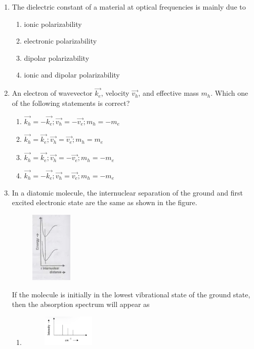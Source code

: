 \documentclass[journal]{IEEEtran}
\numberwithin{equation}{enumi}
\numberwithin{figure}{enumi}
\begin{document}
\begin{enumerate}[start=25]
    \item The dielectric constant of a material at optical frequencies is mainly due to 
    \begin{enumerate}
    	\item ionic polarizability
    	\item electronic polarizability
    	\item dipolar polarizability
    	\item ionic and dipolar polarizability
    \end{enumerate}
    \item An electron of wavevector $\vec{k_e}$, velocity $\vec{v_h}$, and effective mass $m_h$. Which one of the following statements is correct?
    \begin{enumerate}
    	\item $\vec{k_h}=-\vec{k_e};\vec{v_h}=-\vec{v_e};m_h=-m_e$
    	\item $\vec{k_h}=\vec{k_e};\vec{v_h}=\vec{v_e};m_h=m_e$
    	\item $\vec{k_h}=\vec{k_e};\vec{v_h}=-\vec{v_e};m_h=-m_e$
    	\item $\vec{k_h}=-\vec{k_e};\vec{v_h}=\vec{v_e};m_h=-m_e$
   \end{enumerate}
    \item In a diatomic molecule, the internuclear separation of the ground and first excited electronic state are the same as shown in the figure.
    \begin{figure}[!ht]
    \centering
    \includegraphics[width=2cm]{figs/Q30.png}
    \caption{}
    \end{figure}
    \newpage
     If the molecule is initially in the lowest vibrational state of the ground state, then the absorption spectrum will appear as
\begin{enumerate}
\item \begin{figure}[!ht]
\includegraphics[width=2.5cm]{figs/optionA.png}

\end{figure}
\end{enumerate}
\end{enumerate}
\end{document}
